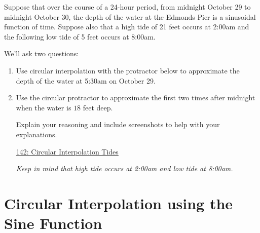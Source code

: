 \documentclass{ximera}
\begin{document}
\begin{example}  \label{E888b0bbdsdsf}
Suppose that over the course of a 24-hour period, from midnight October 29 to midnight October 30, the depth of the water at the Edmonds Pier is a sinusoidal function of time. Suppose also that a high tide of 21 feet occurs at 2:00am and the following low tide of 5 feet occurs at 8:00am. 

We'll ask two questions:

\begin{enumerate}
\item Use circular interpolation with the protractor below to approximate the depth of the water at 5:30am on October 29.

\item Use the circular protractor to approximate the first two times after midnight when the water is $18$ feet deep.

Explain your reasoning and include screenshots to help with your explanations.
\begin{freeResponse}
\end{freeResponse}

\begin{onlineOnly}
    \begin{center}
\end{center}
\end{onlineOnly}

\href{https://www.desmos.com/calculator/0wxwmkzvky}{142: Circular Interpolation Tides}

\emph{Keep in mind that high tide occurs at 2:00am and low tide at 8:00am.}

\end{enumerate}
\end{example}


\section{Circular Interpolation using the Sine Function}
\end{document}
